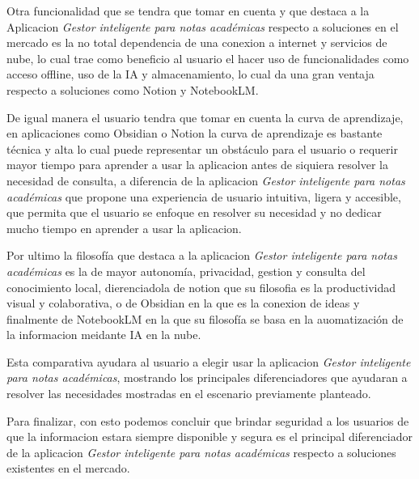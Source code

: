 \vspace{.5cm}

\noindent Otra funcionalidad que se tendra que tomar en cuenta y que destaca a la Aplicacion \textit{ Gestor inteligente para notas académicas} respecto a soluciones en el mercado es la no total dependencia de una conexion a internet y servicios de nube, lo cual trae como beneficio al usuario el hacer uso de funcionalidades como acceso offline, uso de la IA y almacenamiento, lo cual da una gran ventaja respecto a soluciones como Notion y NotebookLM.\

\vspace{.5cm}

\noindent De igual manera el usuario tendra que tomar en cuenta la curva de aprendizaje, en aplicaciones como Obsidian o Notion la curva de aprendizaje es bastante técnica y alta lo cual puede representar un obstáculo para el usuario o requerir mayor tiempo para aprender a usar la aplicacion antes de siquiera resolver la necesidad de consulta, a diferencia de la aplicacion \textit{Gestor inteligente para notas académicas} que propone una experiencia de usuario intuitiva, ligera y accesible, que permita que el usuario se enfoque en resolver su necesidad y no dedicar mucho tiempo en aprender a usar la aplicacion.

\vspace{.5cm}

\noindent Por ultimo la filosofía que destaca a la aplicacion \textit{Gestor inteligente para notas académicas} es la de mayor autonomía, privacidad, gestion y consulta del conocimiento local, dierenciadola de notion que su filosofia es la productividad visual y colaborativa, o de Obsidian en la que es la conexion de ideas y finalmente de NotebookLM en la que su filosofía se basa en la auomatización de la informacion meidante IA en la nube.

\vspace{.5cm}

\noindent Esta comparativa ayudara al usuario a elegir usar la aplicacion \textit{Gestor inteligente para notas académicas}, mostrando los principales diferenciadores que ayudaran a resolver las necesidades mostradas en el escenario previamente planteado.

\vspace{.5cm}


\noindent Para finalizar, con esto podemos concluir que brindar seguridad a los usuarios de que la informacion estara siempre disponible y segura es el principal diferenciador de la aplicacion  \textit{Gestor inteligente para notas académicas} respecto a soluciones existentes en el mercado.